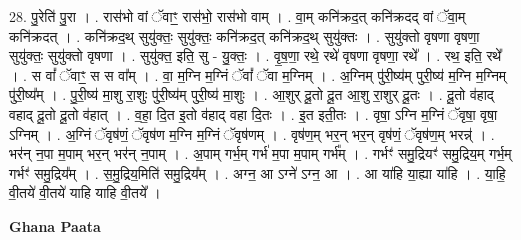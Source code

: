 \documentclass[17pt]{extarticle}
\begin{document}
28. पु॒रेति॑ पु॒रा । . रास॑भो वां ॅवाꣳ॒॒ रास॑भो॒ रास॑भो वाम् । . वा॒म् कनि॑क्रद॒त् कनि॑क्रदद् वां ॅवा॒म् कनि॑क्रदत् । . कनि॑क्रद॒थ् सुयु॑क्तः॒ सुयु॑क्तः॒ कनि॑क्रद॒त् कनि॑क्रद॒थ् सुयु॑क्तः । . सुयु॑क्तो वृषणा वृषणा॒ सुयु॑क्तः॒ सुयु॑क्तो वृषणा । . सुयु॑क्त॒ इति॒ सु - यु॒क्तः॒ । . वृ॒ष॒णा॒ रथे॒ रथे॑ वृषणा वृषणा॒ रथे᳚ । . रथ॒ इति॒ रथे᳚ । . स वां᳚ ॅवाꣳ॒॒ स स वा᳚म् । . वा॒ म॒ग्नि म॒ग्निं ॅवां᳚ ॅवा म॒ग्निम् । . अ॒ग्निम् पु॑री॒ष्य॑म् पुरी॒ष्य॑ म॒ग्नि म॒ग्निम् पु॑री॒ष्य᳚म् । . पु॒री॒ष्य॑ मा॒शु रा॒शुः पु॑री॒ष्य॑म् पुरी॒ष्य॑ मा॒शुः । . आ॒शुर् दू॒तो दू॒त आ॒शु रा॒शुर् दू॒तः । . दू॒तो व॑हाद् वहाद् दू॒तो दू॒तो व॑हात् । . व॒हा॒ दि॒त इ॒तो व॑हाद् वहा दि॒तः । . इ॒त इती॒तः । . वृषा॒ ऽग्नि म॒ग्निं ॅवृषा॒ वृषा॒ ऽग्निम् । . अ॒ग्निं ॅवृष॑णं॒ ॅवृष॑ण म॒ग्नि म॒ग्निं ॅवृष॑णम् । . वृष॑ण॒म् भर॒न् भर॒न् वृष॑णं॒ ॅवृष॑ण॒म् भरन्न्॑ । . भर॑न् न॒पा म॒पाम् भर॒न् भर॑न् न॒पाम् । . अ॒पाम् गर्भ॒म् गर्भ॑ म॒पा म॒पाम् गर्भ᳚म् । . गर्भꣳ॑ समु॒द्रियꣳ॑ समु॒द्रिय॒म् गर्भ॒म् गर्भꣳ॑ समु॒द्रिय᳚म् । . स॒मु॒द्रिय॒मिति॑ समु॒द्रिय᳚म् । . अग्न॒ आ ऽग्ने॑ ऽग्न॒ आ । . आ या॑हि या॒ह्या या॑हि । . या॒हि॒ वी॒तये॑ वी॒तये॑ याहि याहि वी॒तये᳚ । \newline

\textbf{Ghana Paata } \newline
\end{document}
